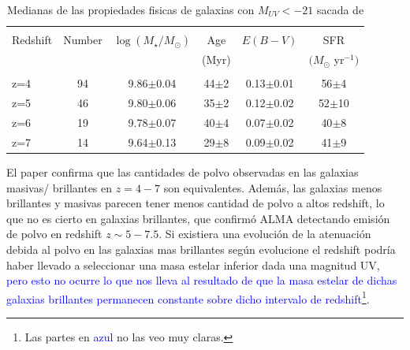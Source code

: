 \documentclass{article}
\begin{document}
\begin{table}[h]
\begin{center}
\begin{tabular}{lccccc}
\hline \hline\\
Redshift & Number & $\log(M_\star/M_\odot)$ & Age & $E(B-V)$ & SFR\\
	&	&	&	(Myr)	&	& $(M_\odot$ yr$^{-1})$\\
\hline\\
z=4 & 94 & 9.86$\pm$0.04 & 44$\pm$2 & 0.13$\pm$0.01 & 56$\pm$4\\
z=5 & 46 & 9.80$\pm$0.06 & 35$\pm$2 & 0.12$\pm$0.02 & 52$\pm$10\\
z=6 & 19 & 9.78$\pm$0.07 & 40$\pm$4 & 0.07$\pm$0.02 & 40$\pm$8\\
z=7 & 14 & 9.64$\pm$0.13 & 29$\pm$8 & 0.09$\pm$0.02 & 41$\pm$9\\
\hline
\end{tabular}
\caption{\label{tab:finkelstein1} Medianas de las propiedades fisicas de galaxias con $M_{UV}<-21$ sacada de \cite{finkelstein2015increasing}}
\end{center}
\end{table}

El paper \cite{finkelstein2015increasing} confirma que las cantidades de polvo observadas en las galaxias masivas/ brillantes en $z=4-7$ son equivalentes. Además, las galaxias menos brillantes y masivas parecen tener menos cantidad de polvo a altos redshift, lo que no es cierto en galaxias brillantes, que confirmó ALMA detectando emisión de polvo en redshift $z\sim 5-7.5$. Si existiera una evolución de la atenuación debida al polvo en las galaxias mas brillantes según evolucione el redshift  podría haber llevado a seleccionar una masa estelar inferior dada una magnitud UV, \textcolor{blue}{pero esto no ocurre lo que nos lleva al resultado de que la masa estelar de dichas galaxias brillantes permanecen constante sobre dicho intervalo de redshift}\footnote{Las partes en  \textcolor{blue}{azul} no las veo muy claras.}. \\
\end{document}
